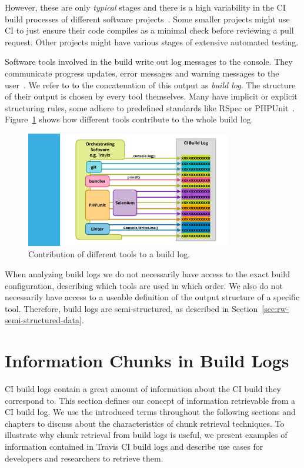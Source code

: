 \documentclass[\myrootdir/main.tex]{subfiles}
\begin{document}
However, these are only \emph{typical} stages and there is a high variability in the CI build processes of different software projects~\cite{staahl2014modeling}.
Some smaller projects might use CI to just ensure their code compiles as a minimal check before reviewing a pull request.
Other projects might have various stages of extensive automated testing.

Software tools involved in the build write out log messages to the console.
They communicate progress updates, error messages and warning messages to the user~\cite{yuan2012characterizing}.
We refer to to the concatenation of this output as \emph{build log}.
The structure of their output is chosen by every tool themselves.
Many have implicit or explicit structuring rules, some adhere to predefined standards like RSpec or PHPUnit~\cite{phpunit2019logging,rspec2019format}.
Figure~\ref{fig:tool-log-contribution} shows how different tools contribute to the whole build log.

\begin{figure}[htbp]
	\centering
	\includegraphics[page=1, width=0.8\textwidth, trim={5cm 0.5cm 0.5cm 0.5cm}, clip]{img/overview-graphics.pdf}
	\caption{Contribution of different tools to a build log.}
	\label{fig:tool-log-contribution}
\end{figure}

When analyzing build logs we do not necessarily have access to the exact build configuration, describing which tools are used in which order.
We also do not necessarily have access to a useable definition of the output structure of a specific tool.
Therefore, build logs are semi-structured, as described in Section~\ref{sec:rw-semi-structured-data}.


\section{Information Chunks in Build Logs}
\label{sec:bli}
CI build logs contain a great amount of information about the CI build they correspond to.
This section defines our concept of information retrievable from a CI build log.
We use the introduced terms throughout the following sections and chapters to discuss about the characteristics of chunk retrieval techniques.
To illustrate why chunk retrieval from build logs is useful, we present examples of information contained in Travis CI build logs and describe use cases for developers and researchers to retrieve them.
\end{document}

